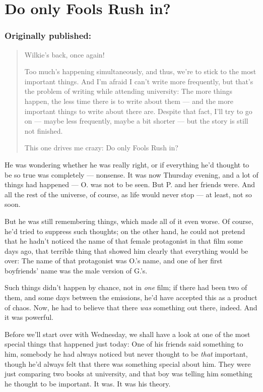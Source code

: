 \chapter{Do only Fools Rush in?}
\label{cha:do-only-fools}
\subsection*{Originally published: }
\begin{quote}
Wilkie's back, once again!

Too much's happening simultaneously, and thus, we're to stick to the most important things. And I'm afraid I can't write more frequently, but that's the problem of writing while attending university: The more things happen, the less time there is to write about them --- and the more important things to write about there are. 
Despite that fact, I'll try to go on --- maybe less frequently, maybe a bit shorter --- but the story is still not finished.

This one drives me crazy: Do only Fools Rush in?
\end{quote}

He was wondering whether he was really right, or if everything he'd thought to be so true was completely --- nonsense. 
It was now Thursday evening, and a lot of things had happened --- O. was not to be seen. 
But P. and her friends were.
And all the rest of the universe, of course, as life would never stop --- at least, not so soon.

But he was still remembering things, which made all of it even worse. Of course, he'd tried to suppress such thoughts; on the other hand, he could not pretend that he hadn't noticed the name of that female protagonist in that film some days ago, that terrible thing that showed him clearly that everything would be over: The name of that protagonist was O.'s name, and one of her first boyfriends' name was the male version of G.'s.

Such things didn't happen by chance, not in \emph{one} film; if there had been two of them, and some days between the emissions, he'd have accepted this as a product of chaos. 
Now, he had to believe that there \emph{was} something out there, indeed. 
And it was powerful.

Before we'll start over with Wednesday, we shall have a look at one of the most special things that happened just today: One of his friends said something to him, somebody he had always noticed but never thought to be \emph{that} important, though he'd always felt that there was something special about him. 
They were just comparing two books at university, and that boy was telling him something he thought to be important. 
It was. 
It was his theory.

